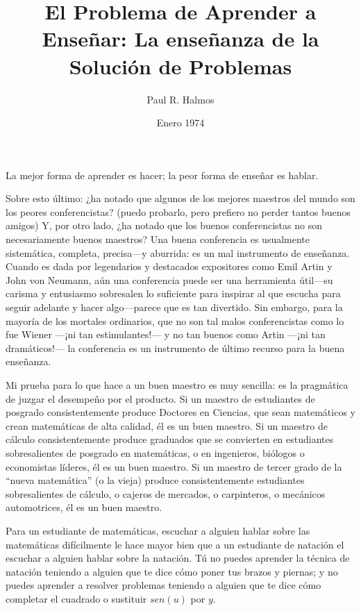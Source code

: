 \documentclass[12pt]{article}
\title{El Problema de Aprender a Enseñar: La enseñanza de la Solución de Problemas}
\author{Paul R. Halmos}
\date{Enero 1974}
\begin{document}
    \maketitle

    La mejor forma de aprender es hacer; la peor forma de enseñar es hablar.

    Sobre esto último: ¿ha notado que algunos de los mejores maestros del mundo son los peores conferencistas?
    (puedo probarlo, pero prefiero no perder tantos buenos amigos) Y, por otro lado, ¿ha notado que los buenos
    conferencistas no son necesariamente buenos maestros?
    Una buena conferencia es usualmente sistemática, completa, precisa—y aburrida: es un mal instrumento de enseñanza.
    Cuando es dada por legendarios y destacados expositores como Emil Artin y John von Neumann, aún una conferencia
    puede ser una herramienta útil—su carisma y entusiasmo sobresalen lo suficiente para inspirar al que escucha para
    seguir adelante y hacer algo—parece que es tan divertido.
    Sin embargo, para la mayoría de los mortales ordinarios, que no son tal malos conferencistas como lo fue Wiener
    —¡ni tan estimulantes!— y no tan buenos como Artin —¡ni tan dramáticos!— la conferencia es un instrumento de último
    recurso para la buena enseñanza.

    Mi prueba para lo que hace a un buen maestro es muy sencilla: es la pragmática de juzgar el desempeño por el
    producto.
    Si un maestro de estudiantes de posgrado consistentemente produce Doctores en Ciencias, que sean
    matemáticos y crean matemáticas de alta calidad, él es un buen maestro.
    Si un maestro de cálculo consistentemente produce graduados que se convierten en estudiantes sobresalientes de posgrado en
    matemáticas, o en ingenieros, biólogos o economistas líderes, él es un buen maestro.
    Si un maestro de tercer grado de la “nueva matemática” (o la vieja) produce consistentemente estudiantes sobresalientes de cálculo, o
    cajeros de mercados, o carpinteros, o mecánicos automotrices, él es un buen maestro.

    Para un estudiante de matemáticas, escuchar a alguien hablar sobre las matemáticas difícilmente le hace
    mayor bien que a un estudiante de natación el escuchar a alguien hablar sobre la natación.
    Tú no puedes aprender la técnica de natación teniendo a alguien que te dice cómo poner tus brazos y piernas; y no puedes
    aprender a resolver problemas teniendo a alguien que te dice cómo completar el cuadrado o sustituir $sen(u)$
    por $y$.
\end{document}
